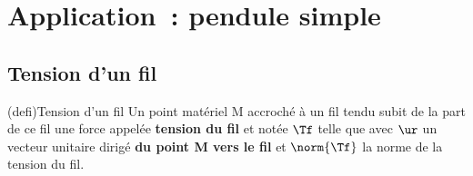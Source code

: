 \documentclass[../../main/main.tex]{subfiles}
\begin{document}
\section{Application~: pendule simple}

\subsection{Tension d'un fil}
\begin{tcb*}(defi){Tension d'un fil}
	Un point matériel M accroché à un fil tendu subit de la part de ce fil une
	force appelée \textbf{tension du fil} et notée $\Tf$ telle que
	\psw{
		\[\boxed{\Tf = \norm{\Tf}\ur}\]
	}
	avec $\ur$ un vecteur unitaire dirigé \textbf{du point M vers le fil} et
	$\norm{\Tf}$ la norme de la tension du fil.
\end{tcb*}
\end{document}
